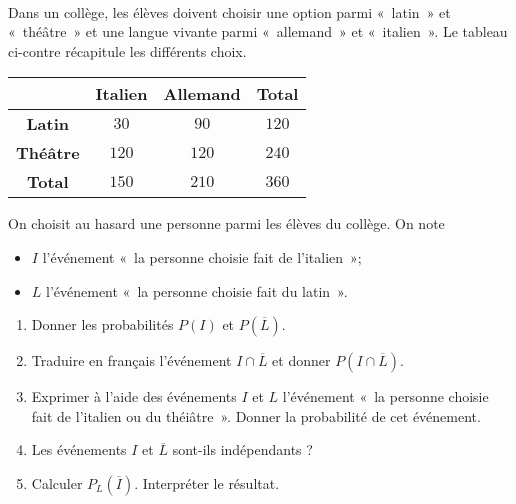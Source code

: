 \documentclass[11pt]{article}
\begin{document}
\begin{exo}[$6$ points]~\\
\begin{minipage}{.55\textwidth}
Dans un collège, les élèves doivent choisir une option parmi «~latin~»
et «~thé\^atre~» et une langue vivante parmi «~allemand~» et «~italien~». Le
tableau ci-contre récapitule les différents choix.
\end{minipage}
\begin{minipage}{.45\textwidth}
  \begin{center}
 \begin{tabular}{cccc}
  \toprule
  & \textbf{Italien} & \textbf{Allemand} & \textbf{Total} \\
  \midrule
  \textbf{Latin} & $30$ & $90$ & $120$ \\
  \textbf{Thé\^atre} & $120$ & $120$ & $240$ \\
  \textbf{Total} & $150$ & $210$ & $360$ \\
  \bottomrule
\end{tabular}
  \end{center}
\end{minipage}
On choisit au hasard une personne parmi les élèves du collège. On note
\begin{itemize}
  \item $I$ l'événement «~la personne choisie fait de l'italien~»;
  \item $L$ l'événement «~la personne choisie fait du latin~».
\end{itemize}
\begin{enumerate}
  \item Donner les probabilités $P(I)$ et $P(\overline L)$.
  \item Traduire en français l'événement $I\cap \overline L$ et donner
    $P(I\cap\overline L)$.
  \item Exprimer à l'aide des événements $I$ et $L$ l'événement «~la personne
    choisie fait de l'italien ou du théi\^atre~». Donner la probabilité de cet
    événement.
  \item Les événements $I$ et $\overline L$ sont-ils indépendants ?
  \item Calculer $P_{L}(\overline I)$. Interpréter le résultat.
\end{enumerate}
\end{exo}
\end{document}
